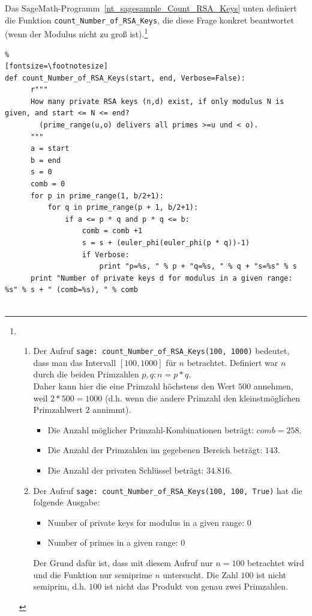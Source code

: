 \begin{refsegment}
 Das SageMath-Programm~\ref{nt_sagesample_Count_RSA_Keys} unten
definiert die Funktion \verb#count_Number_of_RSA_Keys#, die diese Frage konkret
beantwortet (wenn der Modulus nicht zu groß ist).\footnote{%
\strut\\[-2\baselineskip]
\begin{enumerate}[nosep,label=\emph{\alph*})]
\item Der Aufruf \verb#sage: count_Number_of_RSA_Keys(100, 1000)# bedeutet, dass
man das Intervall $[100, 1000]$ für $n$ betrachtet.
Definiert war $n$ durch die beiden Primzahlen $p, q: n = p*q$.\\
Daher kann hier die eine Primzahl höchstens den Wert $500$ annehmen, weil
$2 * 500 =1000$ (d.h. wenn die andere Primzahl den kleinstmöglichen Primzahlwert $2$
annimmt).
\begin{itemize}[nosep,label={}]
\item Die Anzahl möglicher Primzahl-Kombinationen beträgt: $comb = 258$.
\item Die Anzahl der Primzahlen im gegebenen Bereich beträgt: $143$.
\item Die Anzahl der privaten Schlüssel beträgt: $34.816$.
\end{itemize}
\item
Der Aufruf \verb#sage: count_Number_of_RSA_Keys(100, 100, True)#
hat die folgende Ausgabe:
\begin{itemize}[nosep,label=-]
\item Number of private keys for modulus in a given range: 0
\item Number of primes in a given range: 0
\end{itemize}
Der Grund dafür ist, dass mit diesem Aufruf nur $n=100$ betrachtet wird und
   die Funktion nur semiprime $n$
untersucht. Die Zahl $100$ ist nicht
   semiprim, d.h. $100$ ist nicht das Produkt von genau zwei Primzahlen.
\end{enumerate}
}


\begin{sagecode}
\begin{Verbatim}%
[fontsize=\footnotesize]
def count_Number_of_RSA_Keys(start, end, Verbose=False):
      r"""
      How many private RSA keys (n,d) exist, if only modulus N is given, and start <= N <= end?
        (prime_range(u,o) delivers all primes >=u und < o).
      """
      a = start
      b = end
      s = 0
      comb = 0
      for p in prime_range(1, b/2+1):
          for q in prime_range(p + 1, b/2+1):
              if a <= p * q and p * q <= b:
                  comb = comb +1
                  s = s + (euler_phi(euler_phi(p * q))-1)
                  if Verbose:
                      print "p=%s, " % p + "q=%s, " % q + "s=%s" % s
      print "Number of private keys d for modulus in a given range: %s" % s + " (comb=%s), " % comb


\end{Verbatim}
\end{sagecode}
\end{refsegment}
